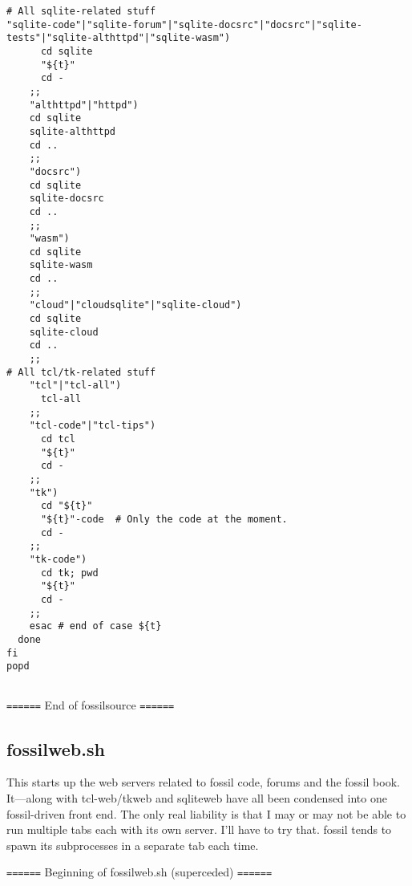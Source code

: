 \documentclass[11pt]{article}
\begin{document}
\begin{verbatim}
# All sqlite-related stuff
"sqlite-code"|"sqlite-forum"|"sqlite-docsrc"|"docsrc"|"sqlite-tests"|"sqlite-althttpd"|"sqlite-wasm") 
      cd sqlite
      "${t}"
      cd -
    ;;
    "althttpd"|"httpd") 
	cd sqlite
	sqlite-althttpd
	cd ..
    ;;
    "docsrc")
	cd sqlite
	sqlite-docsrc
	cd ..
    ;;
    "wasm")
	cd sqlite
	sqlite-wasm
	cd ..
    ;;
    "cloud"|"cloudsqlite"|"sqlite-cloud")
	cd sqlite
	sqlite-cloud
	cd ..
    ;;
# All tcl/tk-related stuff
    "tcl"|"tcl-all")
      tcl-all
    ;;
    "tcl-code"|"tcl-tips")
      cd tcl
      "${t}"
      cd -
    ;;
    "tk")
      cd "${t}"
      "${t}"-code  # Only the code at the moment.
      cd -
    ;;
    "tk-code") 
      cd tk; pwd
      "${t}"
      cd -
    ;;
    esac # end of case ${t}
  done
fi
popd


\end{verbatim}
\texttt{======} End of fossilsource \texttt{======}

\subsection*{fossilweb.sh}
\label{sec:org7a65685}

This starts up the web servers related to fossil code, forums and the fossil book. It—along with tcl-web/tkweb and sqliteweb have all been condensed into one fossil-driven front end. The only real liability is that I may or may not be able to run multiple tabs each with its own server. I'll have to try that. fossil tends to spawn its subprocesses in a separate tab each time.

\texttt{======} Beginning of fossilweb.sh (superceded) \texttt{======}
\end{document}
